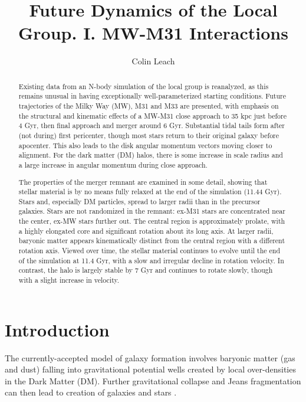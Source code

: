 \documentclass[twocolumn]{aastex63}
\begin{document}
	
\title{Future Dynamics of the Local Group. I. MW-M31 Interactions}

\author[0000-0003-3608-1546]{Colin Leach}

\begin{abstract}
	
Existing data from an N-body simulation of the local group is reanalyzed, as this remains unusual in having exceptionally well-parameterized starting conditions. Future trajectories of the Milky Way (MW), M31 and M33 are presented, with emphasis on the structural and kinematic effects of a MW-M31 close approach to 35 kpc just before 4 Gyr, then final approach and merger around 6 Gyr. Substantial tidal tails form after (not during) first pericenter, though most stars return to their original galaxy before apocenter. This also leads to the disk angular momentum vectors moving closer to alignment. For the dark matter (DM) halos, there is some increase in scale radius and a large increase in angular momentum during close approach. 

The properties of the merger remnant are examined in some detail, showing that stellar material is by no means fully relaxed at the end of the simulation (11.44 Gyr). Stars and, especially DM particles, spread to larger radii than in the precursor galaxies. Stars are not randomized in the remnant: ex-M31 stars are concentrated near the center, ex-MW stars further out.  The central region is approximately prolate, with a highly elongated core and significant rotation about its long axis. At larger radii, baryonic matter appears kinematically distinct from the central region with a different rotation axis. Viewed over time, the stellar material continues to evolve until the end of the simulation at 11.4 Gyr, with a slow and irregular decline in rotation velocity. In contrast, the halo is largely stable by 7 Gyr and continues to rotate slowly, though with a slight increase in velocity.

	
\end{abstract}




\section{Introduction}

The currently-accepted model of galaxy formation involves baryonic matter (gas and dust) falling into gravitational potential wells created by local over-densities in the Dark Matter (DM). Further gravitational collapse and Jeans fragmentation can then lead to creation of galaxies and stars \citep{mo_galaxy_2010}.
\end{document}
